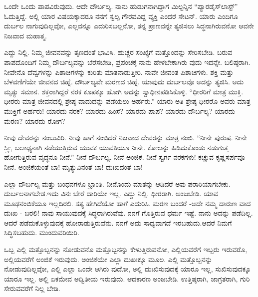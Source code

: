 ಒಂದೇ ಒಂದು ಪಾಪವಿರುವುದು. ಆದೇ ದೌರ್ಬಲ್ಯ. ನಾನು ಹುಡುಗನಾಗಿದ್ದಾಗ ಮಿಲ್ಟನ್ನಿನ “ಪ್ಯಾರಡೈಸ್​ ಲಾಸ್ಟ್​” ಓದುತ್ತಿದ್ದೆ. ಅಲ್ಲಿ ಯಾರ ವಿಷಯಕ್ಕಾದರೂ ನನಗೆ ಸ್ವಲ್ಪ ಗೌರವವಿದ್ದ ವ್ಯಕ್ತಿ ಎಂದರೆ ಸೇಟನ್​. ಯಾರು ಎಂದಿಗೂ ದುರ್ಬಲ ನಾಗುವುದಿಲ್ಲವೋ, ಎಲ್ಲವನ್ನೂ ಎದುರಿಸಬಲ್ಲನೋ, ತನ್ನ ಪ್ರಾಣವನ್ನೇ ತ್ಯಜಿಸಲು ಸಿದ್ಧನಾಗಿರುವನೋ ಆವನೇ ನಿಜವಾದ ಮಹಾತ್ಮ.

ಎದ್ದು ನಿಲ್ಲಿ. ನಿಮ್ಮ ಜೀವನವನ್ನು ತೃಣದಂತೆ ಭಾವಿಸಿ. ಹುಚ್ಚರ ಸಂಖ್ಯೆಗೆ ಮತ್ತೊಂದನ್ನು ಸೇರಿಸಬೇಡಿ. ಬರುವ ಪಾಪದೊಂದಿಗೆ ನಿಮ್ಮ ದೌರ್ಬಲ್ಯವನ್ನು ಬೆರೆಸಬೇಡಿ, ಪ್ರಪಂಚಕ್ಕೆ ನಾನು ಹೇಳಬೇಕಾಗಿರು ವುದು ಇದನ್ನೇ. ಬಲಿಷ್ಠರಾಗಿ. ನೀವೇನೊ ದೆವ್ವಗಳನ್ನು ಪಿಶಾಚಿಗಳನ್ನು ಕುರಿತು ಮಾತನಾಡುತ್ತೀರಿ. ನಾವೇ ಜೀವಂತ ಪಿಶಾಚಿಗಳು. ಶಕ್ತಿ ಮತ್ತು ಬೆಳವಣಿಗೆಯೇ ಜೀವನದ ಚಿಹ್ನೆ. ದೌರ್ಬಲ್ಯವೇ ಮರಣದ ಚಿಹ್ನೆ. ಯಾವುದು ದುರ್ಬಲವೊ ಅದನ್ನು ತ್ಯಜಿಸಿ. ಅದು ಮೃತ್ಯು ಸಮಾನ. ಶಕ್ತರಾಗಿದ್ದರೆ ನರಕ ಕೂಪಕ್ಕೂ ಹೋಗಿ ಅದನ್ನು ಸ್ವಾಧೀನಪಡಿಸಿಕೊಳ್ಳಿ. “ಧೀರರಿಗೆ ಮಾತ್ರ ಮುಕ್ತಿ. ಧೀರರು ಮಾತ್ರ ಜೀವನದಲ್ಲಿ ಶ್ರೇಷ್ಠ ವಾದುದನ್ನು ಪಡೆಯಲು ಅರ್ಹರು.” ಯಾರು ಅತಿ ಶ್ರೇಷ್ಠ ಧೀರರೊ ಅವರು ಮಾತ್ರ ಮುಕ್ತಿಗೆ ಅರ್ಹರು! ಯಾರದು ನರಕ? ಯಾರದು ಹಿಂಸೆ? ಯಾರದು ಪಾಪ? ಯಾರದು ದೌರ್ಬಲ್ಯ? ಯಾರದು ಮರಣ? ಯಾರದು ರೋಗ?

ನೀವು ದೇವರನ್ನು ನಂಬುವಿರಿ. ನೀವು ಹಾಗೆ ನಂಬಿದರೆ ನಿಜವಾದ ದೇವರನ್ನು ಮಾತ್ರ ನಂಬಿ. “ನೀನೇ ಪುರುಷ. ನೀನೇ ಸ್ತ್ರೀ, ಬಲಾಢ್ಯನಾಗಿ ನಡೆಯುತ್ತಿರುವ ಯುವಕ ಯುವತಿಯೂ ನೀನೇ. ಕೋಲನ್ನು ಹಿಡಿದುಕೊಂಡು ನಡುಗುತ್ತ ಹೋಗುತ್ತಿರುವ ವೃದ್ಧನೂ ನೀನೆ.” ನೀನೆ ದೌರ್ಬಲ್ಯ. ನೀನೆ ಅಂಜಿಕೆ. ನೀನೆ ಸ್ವರ್ಗ ನರಕಗಳು! ಕಚ್ಚುವ ಕೃಷ್ಣಸರ್ಪವೂ ನೀನೆ. ಅಂಜಿಕೆಯಂತೆ ಬಾ! ಮೃತ್ಯುವಿನಂತೆ ಬಾ! ದುಃಖದಂತೆ ಬಾ!

ಎಲ್ಲಾ ದೌರ್ಬಲ್ಯ ಮತ್ತು ಬಂಧನಗಳೂ ಭ್ರಾಂತಿ. ನೀನೊಂದು ಮಾತನ್ನು ಆಡಿದರೆ ಅವು ಪರಾರಿಯಾಗಬೇಕು. ದುರ್ಬಲನಾಗಬೇಡ.ಇದು ವಿನಃ ಬೇರೆ ದಾರಿಯೇ ಇಲ್ಲ. ಎದ್ದು ನಿಲ್ಲಿ. ಧೀರರಾಗಿ. ಅಂಜಬೇಡಿ. ಯಾವ ಮೂಢನಂಬಿಕೆಯೂ ಇಲ್ಲದಿರಲಿ. ಸತ್ಯ ಹೇಗಿದೆಯೋ ಹಾಗೆ ಎದುರಿಸಿ. ಮರಣ ಬಂದರೆ -ಅದೇ ನಮ್ಮ ದಾರುಣ ವಾದ ದುಃಖ - ಬರಲಿ! ನಾವು ಸಾಯುವುದಕ್ಕೆ ಸಿದ್ಧರಾಗಿರುವೆವು. ನನಗೆ ಗೊತ್ತಿರುವ ಧರ್ಮ ಇಷ್ಟೆ. ನಾನು ಅದನ್ನು ಪಡೆದಿಲ್ಲ. ಆದರೆ ಪಡೆದುಕೊಳ್ಳುವುದಕ್ಕೆ ಹೋರಾಡುತ್ತಿರುವೆನು. ನನಗೆ ಅದು ಸಾಧ್ಯವಾಗದೆ ಇರಬಹುದು.ಆದರೆ ನಿಮಗೆ ಸಿದ್ಧಿಸಬಹುದು. ಮುಂದುವರಿಯಿರಿ.

ಒಬ್ಬ ಎಲ್ಲಿ ಮತ್ತೊಬ್ಬನನ್ನು ನೋಡುವನೊ ಮತ್ತೊಬ್ಬನನ್ನು ಕೇಳುತ್ತಿರುವನೋ, ಎಲ್ಲಿಯವರೆಗೆ ಇಬ್ಬರು ಇರುವರೊ, ಅಲ್ಲಿಯವರೆಗೆ ಅಂಜಿಕೆ ಇರುವುದು. ಅಂಜಿಕೆಯೇ ಎಲ್ಲಾ ದುಖಃಕ್ಕೂ ಮೂಲ. ಎಲ್ಲಿ ಮತ್ತೊಬ್ಬನನ್ನು ನೋಡುವುದಿಲ್ಲವೋ, ಎಲ್ಲಿ ಎಲ್ಲಾ ಒಂದೇ ಆಗಿರು ವುದೋ, ಅಲ್ಲಿ ದುಃಖಿಸುವುದಕ್ಕೆ ಯಾರೂ ಇಲ್ಲ, ಸುಖಿಸುವುದಕ್ಕೂ ಯಾರೂ ಇಲ್ಲ. ಅಲ್ಲಿ ಏಕಮೇವ ಅದ್ವಿತೀಯ ಇರುವುದು. ಆದಕಾರಣ ಅಂಜಬೇಡಿ. ಉತ್ತಿಷ್ಠರಾಗಿ, ಜಾಗ್ರತರಾಗಿ, ಗುರಿ ಸೇರುವವರೆಗೆ ನಿಲ್ಲ ಬೇಡಿ.

